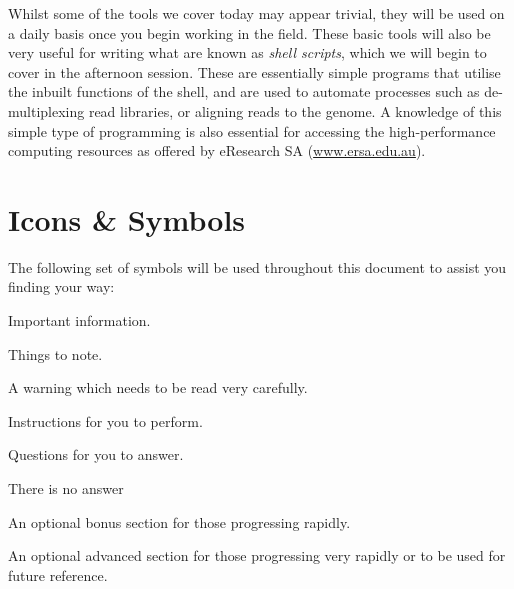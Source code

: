 \documentclass[a4paper,12pt,twoside]{memoir}
\begin{document}
Whilst some of the tools we cover today may appear trivial, they will be used on a daily basis once you begin working in the field.
These basic tools will also be very useful for writing what are known as \textit{shell scripts}, which we will begin to cover in the afternoon session.
These are essentially simple programs that utilise the inbuilt functions of the shell, and are used to automate processes such as de-multiplexing read libraries, or aligning reads to the genome.
A knowledge of this simple type of programming is also essential for accessing the high-performance computing resources as offered by eResearch SA (\url{www.ersa.edu.au}).


\section{Icons \& Symbols}
The following set of symbols will be used throughout this document to assist you finding your way: \\

\begin{information}
Important information.\\
\end{information}

\begin{note}
Things to note.\\
\end{note}

\begin{warning}
A warning which needs to be read very carefully.\\
\end{warning}

\begin{steps}
Instructions for you to perform. \\
\end{steps}

\begin{questions}
Questions for you to answer. \\
\begin{answer}
There is no answer
\end{answer}
\end{questions}

\begin{bonus}
An optional bonus section for those progressing rapidly. \\
\end{bonus}

\begin{advanced}
An optional advanced section for those progressing very rapidly or to be used for future reference. \\
\end{advanced}
\end{document}
